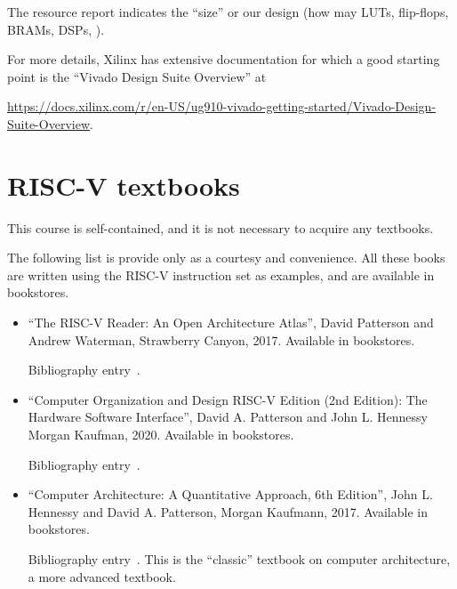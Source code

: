 The resource report indicates the ``size'' or our design (how may
LUTs, flip-flops, BRAMs, DSPs, {\etc}).

For more details, Xilinx has extensive documentation for which a good
starting point is the ``Vivado Design Suite Overview'' at

\url{https://docs.xilinx.com/r/en-US/ug910-vivado-getting-started/Vivado-Design-Suite-Overview}.


\section{RISC-V textbooks}

\label{apx_resources_RISCV_textbooks}

This course is self-contained, and it is not necessary to acquire any
textbooks.

The following list is provide only as a courtesy and convenience.  All
these books are written using the RISC-V instruction set as examples,
and are available in bookstores.

\begin{itemize}

  \item ``The RISC-V Reader: An Open Architecture Atlas'',
    David Patterson and Andrew Waterman,
    Strawberry Canyon, 2017.  Available in bookstores.

    Bibliography entry~\cite{PattersonWaterman2017}.

  \item
    ``Computer Organization and Design RISC-V Edition (2nd Edition): The Hardware Software Interface'',
    David A. Patterson and John L. Hennessy
    Morgan Kaufman, 2020. Available in bookstores.

    Bibliography entry~\cite{PattersonHennessy2020}.

  \item ``Computer Architecture: A Quantitative Approach, 6th Edition'',
    John L. Hennessy and David A. Patterson,
    Morgan Kaufmann, 2017.  Available in bookstores.

    Bibliography entry~\cite{Hennessy2017}.
    This is the ``classic'' textbook on computer architecture, a more
    advanced textbook.

\end{itemize}

